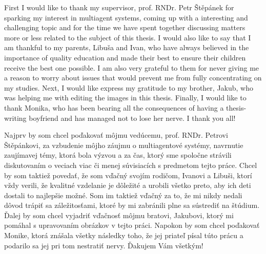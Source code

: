 
First I would like to thank my supervisor, prof. RNDr. Petr Štěpánek for sparking my interest in multiagent systems, coming up with a interesting and challenging topic and for the time we have spent together discussing matters more or less related to the subject of this thesis.
I would also like to say that I am thankful to my parents, Libuša and Ivan, who have always believed in the importance of quality education and made their best to ensure their children receive the best one possible.
I am also very grateful to them for never giving me a reason to worry about issues that would prevent me from fully concentrating on my studies.
Next, I would like express my gratitude to my brother, Jakub, who was helping me with editing the images in this thesis.
Finally, I would like to thank Monika, who has been bearing all the consequences of having a thesis-writing boyfriend and has managed not to lose her nerve.
I thank you all!

\frenchspacing

Najprv by som chcel poďakovať môjmu vedúcemu, prof. RNDr. Petrovi Štěpánkovi, za vzbudenie môjho záujmu o multiagentové systémy, navrnutie zaujímavej témy, ktorá bola výzvou a za čas, ktorý sme spoločne strávili diskutovaním o veciach viac či menej súvisiacích s predmetom tejto práce.
Chcel by som taktiež povedať, že som vďačný svojím rodičom, Ivanovi a Libuši, ktorí vždy verili, že kvalitné vzdelanie je dôležité a urobili všetko preto, aby ich deti dostali to najlepšie možné.
Som im taktiež vďačný za to, že mi nikdy nedali dôvod trápiť sa záležitosťami, ktoré by mi zabránili plne sa sústrediť na štúdium.
Ďalej by som chcel vyjadriť vďačnosť môjmu bratovi, Jakubovi, ktorý mi pomáhal s upravovaním obrázkov v tejto práci.
Napokon by som chcel poďakovať Monike, ktorá znášala všetky následky toho, že jej priateľ písal túto prácu a podarilo sa jej pri tom nestratiť nervy.
Ďakujem Vám všetkým!

\nonfrenchspacing 